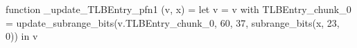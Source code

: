 function _update_TLBEntry_pfn1 (v, x) = let v = { v with TLBEntry_chunk_0 = update_subrange_bits(v.TLBEntry_chunk_0, 60, 37, subrange_bits(x, 23, 0)) } in
  v

